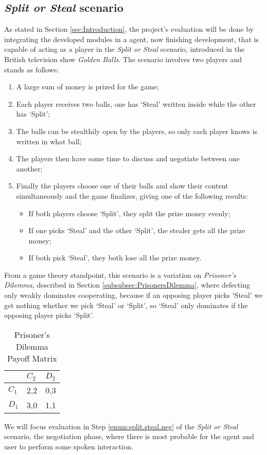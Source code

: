\subsection{\textit{Split or Steal} scenario}
As stated in Section \ref{sec:Introduction}, the project's evaluation will be done by integrating the developed modules in a agent, now finishing development, that is capable of acting as a player in the \textit{Split or Steal} scenario, introduced in the British television show \textit{Golden Balls}\cite{Wikipedia.Golden.Balls}. The scenario involves two players and stands as follows:
\begin{enumerate}
	\item A large sum of money is prized for the game;
	\item Each player receives two balls, one has `Steal' written inside while the other has `Split';
	\item The balls can be stealthily open by the players, so only each player knows is written in what ball;
	\item \label{enum:split.steal.neg}The players then have some time to discuss and negotiate between one another;
	\item Finally the players choose one of their balls and show their content simultaneously and the game finalizes, giving one of the following results:
	\begin{itemize}
		\item If both players choose `Split', they split the prize money evenly;
		\item If one picks `Steal' and the other `Split', the stealer gets all the prize money;
		\item If both pick `Steal', they both lose all the prize money.
	\end{itemize}	
\end{enumerate}

From a game theory standpoint, this scenario is a variation on \textit{Prisoner's Dilemma}, described in Section \ref{subsubsec:PrisonersDilemma}, where defecting only weakly dominates cooperating, because if an opposing player picks `Steal' we get nothing whether we pick `Steal' or `Split', so `Steal' only dominates if the opposing player picks `Split'. 

\begin{table}[]
	\centering
	\begin{tabular}{l|l|l|}
		\cline{2-3}
		& $C_2$   & $D_2$   \\ \hline
		\multicolumn{1}{|l|}{$C_1$} & 2,2 & 0,3 \\ \hline
		\multicolumn{1}{|l|}{$D_1$} & 3,0 & 1,1 \\ \hline
	\end{tabular}
	\caption{Prisoner's Dilemma Payoff Matrix}
	\label{PrisonerDilemaPayoffMatrix}
\end{table}	

We will focus evaluation in Step \ref{enum:split.steal.neg} of the \textit{Split or Steal} scenario, the negotiation phase, where there is most probable for the agent and user to perform some spoken interaction.